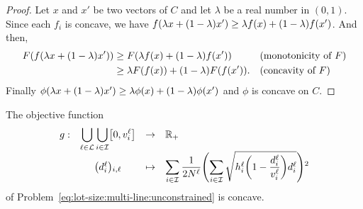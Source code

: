 \begin{proof}
Let $x$ and $x'$ be two vectors of $C$ and let $\lambda$ be a real number in $(0,1)$.
Since each $f_i$ is concave, we have
$f\bracket{\lambda x +(1-\lambda) x'} \ge \lambda f(x) + (1-\lambda) f(x')$.
And then,
\begin{subequations}
\begin{align}
  F\bracket{f\bracket{\lambda x +(1-\lambda) x'}}
  &\ge F\bracket{\lambda f(x) + (1-\lambda) f(x')}
  && \mbox{(monotonicity of $F$)}
  \\
  &\ge \lambda F\bracket{f(x)} + (1-\lambda) F\bracket{f(x')}.
  && \mbox{(concavity of $F$)}
\end{align}
\end{subequations}
Finally $\phi\bracket{\lambda x +(1-\lambda) x'} \ge \lambda \phi(x) + (1-\lambda) \phi(x')$ and $\phi$ is concave on $C$.
\end{proof}



\begin{lem}\label{lem:concave-objective-function}
The objective function
\begin{equation}
\begin{array}{rccl}
  g: & \ds\bigcup_{\ell\in\lines}\bigcup_{i\in\REF} \sqbracket{0,\rate_i^{\ell}} & \to & \RR_+ \\
     & \bracket{\demand_i^{\ell}}_{i,\ell} & \mapsto & \ds\sum_{i\in\REF} \frac{1}{2\nbsetups^{\ell}}\bracket{\sum_{i\in\REF}\sqrt{\holding_i^{\ell}\bracket{1-\frac{\demand_i^{\ell}}{\rate_i^{\ell}}}\demand_i^{\ell}}}^2
\end{array}
\end{equation}
of Problem~\eqref{eq:lot-size:multi-line:unconstrained} is concave.
\end{lem}


